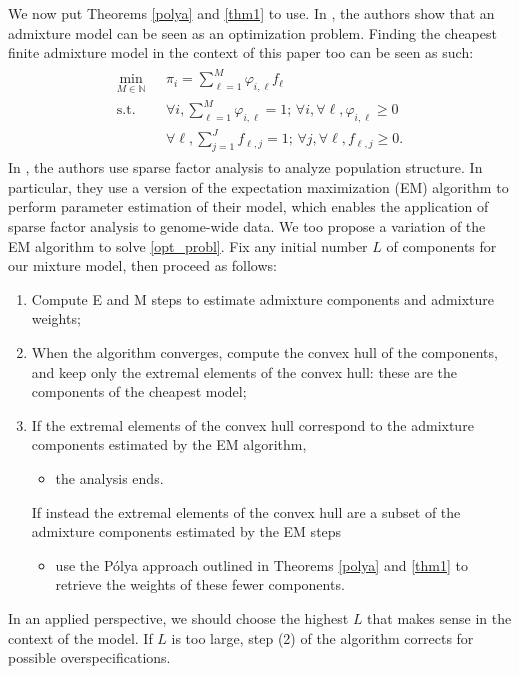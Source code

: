 \documentclass[12pt, reqno]{amsart}
\theoremstyle{definition}
\begin{document}
We now put Theorems \ref{polya} and \ref{thm1} to use. In \cite[Pages 1 and 2]{engel}, the authors show that an admixture model can be seen as an optimization problem. Finding the cheapest finite admixture model in the context of this paper too can be seen as such:
\begin{align}\label{opt_probl}
\begin{split}
\min_{M \in \mathbb{N}} \text{ } &\pi_i=\sum_{\ell=1}^M \varphi_{i,\ell} f_\ell\\
\text{s.t. } &\forall i, \sum_{\ell=1}^M \varphi_{i,\ell}=1 \text{; } \forall i,\forall \ell, \varphi_{i,\ell} \geq 0\\
&\forall \ell, \sum_{j=1}^J f_{\ell,j}=1 \text{; } \forall j,\forall \ell, f_{\ell,j} \geq 0.
\end{split}
\end{align}
In \cite{engel}, the authors use sparse factor analysis to analyze population structure. In particular, they use a version of the expectation maximization (EM) algorithm to perform parameter estimation of their model, which enables the application of sparse factor analysis to genome-wide data. We too propose a variation of the EM algorithm to solve \eqref{opt_probl}. Fix any initial number $L$ of components for our mixture model, then proceed as follows:
\begin{enumerate}
\item Compute E and M steps to estimate admixture components and admixture weights;
\item When the algorithm converges, compute the convex hull of the components, and keep only the extremal elements of the convex hull: these are the components of the cheapest model;
\item If the extremal elements of the convex hull correspond to the admixture components estimated by the EM algorithm, 
\begin{itemize}
\item the analysis ends.
\end{itemize}
If instead the extremal elements of the convex hull are a subset of the admixture components estimated by the EM steps
\begin{itemize}
\item use the Pólya approach outlined in Theorems \ref{polya} and \ref{thm1} to retrieve the weights of these fewer components.
\end{itemize}
\end{enumerate}
In an applied perspective, we should choose the highest $L$ that makes sense in the context of the model. If $L$ is too large, step (2) of the algorithm corrects for possible overspecifications.
\fi
\end{document}
